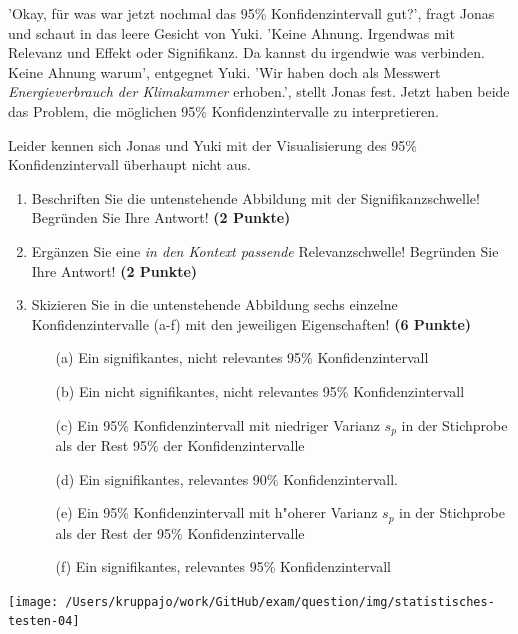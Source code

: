 \documentclass[a4paper, 9pt]{scrartcl}\usepackage[]{graphicx}\usepackage[]{xcolor}
\begin{document}
'Okay, für was war jetzt nochmal das 95\% Konfidenzintervall gut?', fragt Jonas und schaut in das leere Gesicht von Yuki. 'Keine Ahnung. Irgendwas mit Relevanz und Effekt oder Signifikanz. Da kannst du irgendwie was verbinden. Keine Ahnung warum', entgegnet Yuki. 'Wir haben doch als Messwert \textit{Energieverbrauch der Klimakammer} erhoben.', stellt Jonas fest. Jetzt haben beide das Problem, die möglichen 95\% Konfidenzintervalle zu interpretieren.

\vspace{1ex}

Leider kennen sich Jonas und Yuki mit der Visualisierung des 95\% Konfidenzintervall überhaupt nicht aus. 

\begin{enumerate}
\item Beschriften Sie die untenstehende Abbildung mit der Signifikanzschwelle! Begründen Sie Ihre Antwort! \textbf{(2 Punkte)}
\item Ergänzen Sie eine \textit{in den Kontext passende} Relevanzschwelle! Begründen Sie Ihre Antwort! \textbf{(2 Punkte)} 
\item Skizieren Sie in die untenstehende Abbildung sechs einzelne Konfidenzintervalle (a-f) mit den
  jeweiligen Eigenschaften! \textbf{(6 Punkte)}
  \begin{itemize}
  \item[(a)] Ein signifikantes, nicht relevantes 95\% Konfidenzintervall 	
  \item[(b)] Ein nicht signifikantes, nicht relevantes 95\% Konfidenzintervall 	
  \item[(c)] Ein 95\% Konfidenzintervall mit niedriger Varianz $s_p$ in der Stichprobe als der Rest 95\% der Konfidenzintervalle 	
  \item[(d)] Ein signifikantes, relevantes 90\% Konfidenzintervall. 
  \item[(e)] Ein 95\% Konfidenzintervall mit h{"o}herer Varianz $s_p$ in der Stichprobe als der Rest der 95\% Konfidenzintervalle
  \item[(f)] Ein signifikantes, relevantes 95\% Konfidenzintervall
  \end{itemize}
\end{enumerate}

\begin{center}
  \texttt{[image: /Users/kruppajo/work/GitHub/exam/question/img/statistisches-testen-04]}
\end{center}


 
\clearpage
\end{document}
